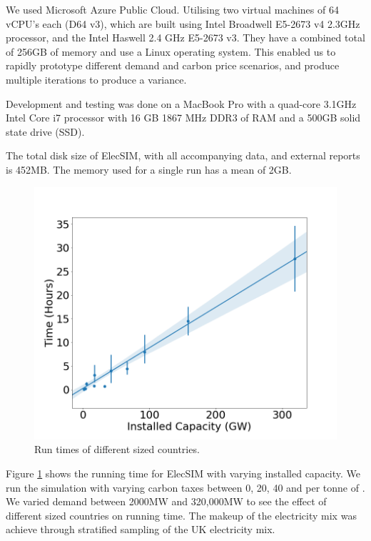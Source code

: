  We used Microsoft Azure Public Cloud. Utilising two virtual machines of 64 vCPU's each (D64 v3), which are built using Intel Broadwell E5-2673 v4 2.3GHz processor, and the Intel Haswell 2.4 GHz E5-2673 v3. They have a combined total of 256GB of memory and use a Linux operating system. This enabled us to rapidly prototype different demand and carbon price scenarios, and produce multiple iterations to produce a variance.

Development and testing was done on a MacBook Pro with a quad-core 3.1GHz Intel Core i7 processor with 16 GB 1867 MHz DDR3 of RAM and a 500GB solid state drive (SSD).

The total disk size of ElecSIM, with all accompanying data, and external reports is 452MB. The memory used for a single run has a mean of 2GB.



\begin{figure}[h]
	\centering
	\includegraphics[width=1\linewidth]{figures/timing_plot}
	\caption{Run times of different sized countries.}
	\label{fig:timingplot}
\end{figure}

Figure \ref{fig:timingplot} shows the running time for ElecSIM with varying installed capacity. We run the simulation with varying carbon taxes between 0, 20, 40 and  per tonne of . We varied demand between 2000MW and 320,000MW to see the effect of different sized countries on running time. The makeup of the electricity mix was achieve through stratified sampling of the UK electricity mix. 

